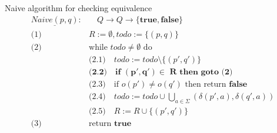 \begin{frame}{Naive algorithm for checking equivalence}
  \begin{align*}
    \underline{\mathit{Naive(p, q)}}: &\quad Q \to Q \to \{\mathbf{true}, \mathbf{false}\} \\
    \text{(1) } & R := \emptyset, \mathit{todo} := \{(p, q)\} \\
    \text{(2) } & \text{while } \mathit{todo} \neq \emptyset \text{ do}\\
      & \text{(2.1)}\quad \mathit{todo} := \mathit{todo} \setminus \{(p', q')\}\\
      & \textbf{(2.2)}\quad \textbf{if } \mathbf{(p', q') \in} \textbf{ R} \textbf{ then goto (2)}\\
      & \text{(2.3)}\quad \text{if } o(p') \neq o(q') \text{ then return } \mathbf{false}\\
      & \text{(2.4)}\quad \mathit{todo} := \mathit{todo} \cup \bigcup_{a \in \Sigma}{(\delta(p', a), \delta(q', a))}\\
      & \text{(2.5)}\quad R := R \cup \{(p', q')\} \\
    \text{(3) } & \text{return } \mathbf{true}\\
  \end{align*}
\end{frame}
